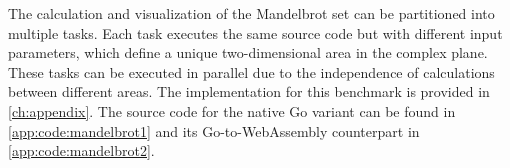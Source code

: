 The calculation and visualization of the Mandelbrot set can be partitioned into multiple tasks. Each task executes the same source code but with different input parameters, which define a unique two-dimensional area in the complex plane. These tasks can be executed in parallel due to the independence of calculations between different areas. The implementation for this benchmark is provided in \autoref{ch:appendix}. The source code for the native Go variant can be found in \autoref{app:code:mandelbrot1} and its Go-to-WebAssembly counterpart in \autoref{app:code:mandelbrot2}.